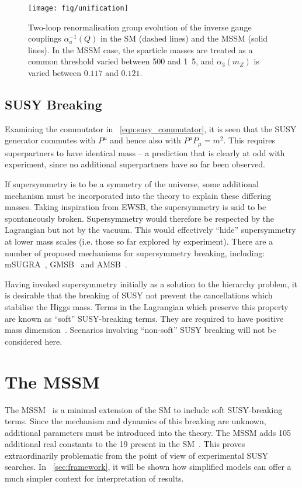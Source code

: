 \begin{figure}[h]
\centering
\texttt{[image: fig/unification]}
\caption[Two-loop renormalisation group evolution of the inverse gauge
couplings]{Two-loop renormalisation group evolution of the inverse gauge
  couplings $\alpha_a^{−1}(Q)$ in the \ac{SM} (dashed lines) and the \ac{MSSM}
  (solid lines). In the MSSM case, the sparticle masses are treated as a common
  threshold varied between \unit{500}{\GeV} and \unit{1.5}{\TeV}, and
  $\alpha_3(m_Z)$ is varied between $0.117$ and $0.121$.~\cite{susy_primer}}
\label{fig:susy_gauge_unification}
\end{figure}

\subsection{\acl{SUSY} Breaking}
Examining the commutator in \eqn~\ref{eqn:susy_commutator}, it is seen that the
\ac{SUSY} generator \Qa commutes with $P^{\mu}$ and hence also with
$P^{\mu}P_{\mu} = m^2$. This requires superpartners to have identical mass -- a
prediction that is clearly at odd with experiment, since no additional
superpartners have so far been observed.

If supersymmetry is to be a symmetry of the universe, some additional mechanism
must be incorporated into the theory to explain these differing masses. Taking
inspiration from \ac{EWSB}, the supersymmetry is said to be spontaneously
broken. Supersymmetry would therefore be respected by the Lagrangian but not by
the vacuum. This would effectively ``hide'' supersymmetry at lower mass scales
(i.e. those so far explored by experiment). There are a number of proposed
mechanisms for supersymmetry breaking, including: \ac{mSUGRA}~\cite{msugra},
\ac{GMSB}~\cite{gmsb} and \ac{AMSB}~\cite{amsb}.

Having invoked supersymmetry initially as a solution to the hierarchy problem,
it is desirable that the breaking of \ac{SUSY} not prevent the cancellations
which stabilise the Higgs mass. Terms in the Lagrangian which preserve this
property are known as ``soft'' \ac{SUSY}-breaking terms. They are required to
have positive mass dimension~\cite{susy_primer}. Scenarios involving
``non-soft'' \ac{SUSY} breaking will not be considered here.

\section{The \acl{MSSM}}
\label{sec:susy_mssm}
The \acf{MSSM}~\cite{mssm} is a minimal extension of the \ac{SM} to include soft
\ac{SUSY}-breaking terms. Since the mechanism and dynamics of this breaking are
unknown, additional parameters must be introduced into the theory. The \ac{MSSM}
adds 105 additional real constants to the 19 present in the
\ac{SM}~\cite[p.~186]{sparticles}. This proves extraordinarily problematic from
the point of view of experimental \ac{SUSY} searches. In
\chap~\ref{sec:framework}, it will be shown how simplified models can offer a
much simpler context for interpretation of results.

